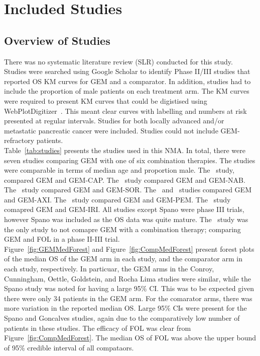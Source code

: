\chapter{Included Studies}\label{trialschap}

\section{Overview of Studies}
There was no systematic literature review (SLR) conducted for this study. Studies were searched using Google Scholar to identify Phase II/III studies that reported OS KM curves for GEM and a comparator. In addition, studies had to include the proportion of male patients on each treatment arm. The KM curves were required to present KM curves that could be digistised using WebPlotDigitizer~\cite{wpd}. This meant clear curves with labelling and numbers at risk presented at regular intervals. Studies for both locally advanced and/or metastatic pancreatic cancer were included. Studies could not include GEM-refractory patients.\\

Table~\ref{tab:studies} presents the studies used in this NMA. In total, there were seven studies comparing GEM with one of six combination therapies. The studies were comparable in terms of median age and proportion male. The~\cite{cunningham2009} study, compared GEM and GEM-CAP. The~\cite{goldstein2015} study compared GEM and GEM-NAB. The~\cite{gonccalves2012} study compared GEM and GEM-SOR. The~\cite{kindler2011} and~\cite{spano2008} studies compared GEM and GEM-AXI. The~\cite{oettle2005} study compared GEM and GEM-PEM. The~\cite{rocha2004} study comapred GEM and GEM-IRI. All studies except Spano were phase III trials, however Spano was included as the OS data was quite mature. The~\cite{conroy} study was the only study to not comapre GEM with a combination therapy; comparing GEM and FOL in a phase II-III trial.\\

Figure~\ref{fig:GEMMedForest} and Figure~\ref{fig:CompMedForest} present forest plots of the median OS of the GEM arm in each study, and the comparator arm in each study, respectively. In particuar, the GEM arms in the Conroy, Cunningham, Oettle, Goldstein, and Rocha Lima studies were similar, while the Spano study was noted for having a large 95\% CI. This was to be expected given there were only 34 patients in the GEM arm. For the comarator arms, there was more variation in the reported median OS. Large 95\% CIs were present for the Spano and Goncalves studies, again due to the comparatively low number of patients in these studies. The efficacy of FOL was clear from Figure~\ref{fig:CompMedForest}. The median OS of FOL was above the upper bound of 95\% credible interval of all compataors. \\

